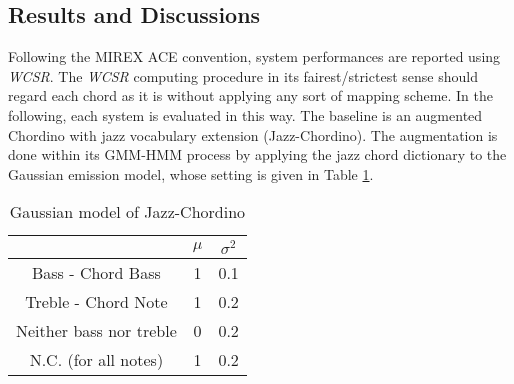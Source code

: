 



\subsection{Results and Discussions}
Following the MIREX ACE convention, system performances are reported using \textit{WCSR}. The \textit{WCSR} computing procedure in its fairest/strictest sense should regard each chord as it is without applying any sort of mapping scheme. In the following, each system is evaluated in this way. The baseline is an augmented Chordino with jazz vocabulary extension (Jazz-Chordino). The augmentation is done within its GMM-HMM process by applying the jazz chord dictionary to the Gaussian emission model, whose setting is given in Table \ref{tab:5-jcgau}.
\begin{table}[h]
\centering
\footnotesize
\begin{tabular}{|c|c|c|} \hline
      & $\mu$ & $\sigma^2$ \\ \hline
Bass - Chord Bass & 1 & 0.1 \\ \hline
Treble - Chord Note & 1 & 0.2  \\ \hline
Neither bass nor treble & 0 & 0.2 \\ \hline
N.C. (for all notes)  & 1 & 0.2  \\ \hline
\end{tabular}
\caption{Gaussian model of Jazz-Chordino}
\label{tab:5-jcgau}
\end{table}

